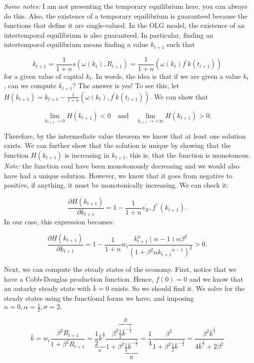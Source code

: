 \documentclass[11pt,twoside,a4paper]{article}
\begin{document}
\emph{Some notes:} I am not presenting the temporary equilibrium here, you can always do this.
Also, the existence of a temporary equilibrium is guaranteed because the functions that define it are single-valued.
In the OLG model, the existence of an intertemporal equilibrium is also guaranteed.
In particular, finding an intertemporal equilibrium means finding a value $k_{t+1}$ such that

$$k_{t+1} = \frac{1}{1+n}s\left(\omega(k_t),R_{t+1}\right) = \frac{1}{1+n}\left( \omega(k_t) f^\prime k(t_{t+1})\right)$$
for a given value of capital $k_t.$
In words, the idea is that if we are given a value $k_t$, can we compute $k_{t+1}$?
The answer is yes!
To see this, let $H(k_{t+1}) = k_{t+1} - \frac{1}{1+n}\left( \omega(k_t), f^\prime k(t_{t+1})\right).$
We can show that 

$$\lim_{k_{t+1} \rightarrow 0} H(k_{t+1}) <0 \quad \mathrm{and} \quad \lim_{k_{t+1} \rightarrow +\infty} H(k_{t+1}) > 0.$$

Therefore, by the intermediate value theorem we know that at least one solution exists.
We can further show that the solution is unique by showing that the function $H(k_{t+1})$ is increasing in $k_{t+1}$, this is, that the function is monotonous.
\emph{Note:} the function coul have been monotonously decreasing and we would also have had a unique solution.
However, we know that it goes from negative to positive, if anything, it must be monotonically increasing.
We can check it:

$$\frac{\partial H(k_{t+1})}{\partial k_{t+1}} = 1 - \frac{1}{1+n}s^{\prime}_{R}, f^{\prime \prime}(k_{t+1}).$$
In our case, this expression becomes:

$$\frac{\partial H(k_{t+1})}{\partial k_{t+1}} = 1 - \frac{1}{1+n}w_{t}\frac{k_{t+1}^\alpha (\alpha -1) \alpha \beta^2}{(1+\beta^2 \alpha {k_{t+1}}^{\alpha - 1})^2} > 0.$$

Next, we can compute the steady states of the economy.
First, notice that we have a Cobb-Douglas production function.
Hence, $f(0)=0$ and we know that an autarky steady state with $\bar{k}=0$ exists.
So we should find it.
We solve for the steady states using the functional forms we have, and imposing $n=0, \alpha=\frac{1}{2}, \sigma =2.$

$$\bar{k} = w_t \frac{\beta^2 R_{t+1}}{1+\beta^2 R_{t+1}} = \underbrace{\frac{1}{2}\bar{k}^\frac{1}{2}}_{w} \frac{\beta^2 \overbrace{\frac{1}{2}\bar{k}^{-\frac{1}{2}}}^{R}}{1+\beta^2 \underbrace{\frac{1}{2}\bar{k}^{-\frac{1}{2}}}_{R}} = \frac{1}{4}\frac{\beta^2}{1+\beta^2 \frac{1}{2}\bar{k}^{-\frac{1}{2}}}=\frac{\beta^2 \bar{k}^\frac{1}{2}}{4\bar{k}^\frac{1}{2} + 2 \beta^2}$$
\end{document}
